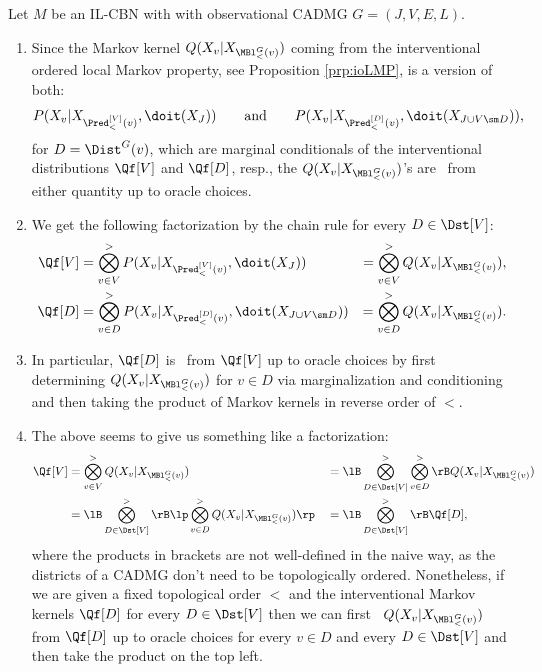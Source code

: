 \begin{Rem} 
    \label{rem:Q-dist-ident}
    Let $M$ be an IL-CBN with with observational CADMG $G=(J,V,E,L)$.
    \begin{enumerate}
        \item Since the Markov kernel $Q(X_v|X_{\MBl^G_<(v)})$ coming from the interventional ordered local Markov property, 
            see Proposition \ref{prp:ioLMP}, is a version of both:
          \[ P(X_v|X_{\Pred^{[V]}_<(v)},\doit(X_J)) \qquad \text{and} \qquad P(X_v|X_{\Pred^{[D]}_<(v)},\doit(X_{J \cup V\sm D})),\]
                for $D=\Dist^G(v)$, which are marginal conditionals of the interventional distributions $\Qf[V]$ and $\Qf[D]$, resp.,
                the $Q(X_v|X_{\MBl^G_<(v)})$'s are \trackable\ from either quantity up to oracle choices.
            \item We get the following factorization by the chain rule for every $D \in \Dst[V]$: %
               \begin{align*}
                   \Qf[V] &= \bigotimes_{v \in V}^> P(X_v|X_{\Pred^{[V]}_<(v)},\doit(X_J)) &= \bigotimes_{v \in V}^> Q(X_v|X_{\MBl^G_<(v)}), \\
                   \Qf[D] &= \bigotimes_{v \in D}^> P(X_v|X_{\Pred^{[D]}_<(v)},\doit(X_{J \cup V\sm D})) &= \bigotimes_{v \in D}^> Q(X_v|X_{\MBl^G_<(v)}).
               \end{align*}
           \item In particular, $\Qf[D]$ is \trackable\ from $\Qf[V]$ up to oracle choices 
               by first determining $Q(X_v|X_{\MBl^G_<(v)})$ for $v \in D$  
               via marginalization and conditioning and then taking the product of Markov kernels in reverse order of $<$.
            \item The above seems to give us something like a factorization:
       \begin{align*}
           \Qf[V] &= \bigotimes_{v \in V}^> Q(X_v|X_{\MBl^G_<(v)}) 
            && = \lB \bigotimes_{D \in \Dst[V]}^> \bigotimes_{v \in D}^>  \rB Q(X_v|X_{\MBl^G_<(v)}) \\
            & = \lB \bigotimes_{D \in \Dst[V]}^> \rB \lp \bigotimes_{v \in D}^>  Q(X_v|X_{\MBl^G_<(v)}) \rp  
            && = \lB \bigotimes_{D \in \Dst[V]}^>\rB \Qf[D],             
       \end{align*}
         where the products in brackets are not well-defined in the naive way, 
         as the districts of a CADMG don't need to be topologically ordered.
         Nonetheless, if we are given a fixed topological order $<$ and the interventional Markov kernels $\Qf[D]$ 
         for every $D \in \Dst[V]$ 
         then we can first \track\ $Q(X_v|X_{\MBl^G_<(v)})$ from $\Qf[D]$ up to oracle choices
         for every $v \in D$ and every $D \in \Dst[V]$ and then take the product
         on the top left. 
    \end{enumerate}
\end{Rem}

